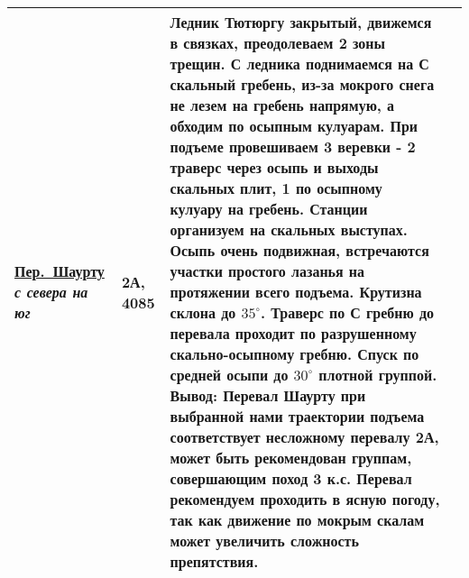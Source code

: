 \begin{longtable}{|>{\centering\arraybackslash}m{4.5cm}|>{\centering\arraybackslash}m{1.8cm}|>{\raggedright\arraybackslash}m{9.6cm}|>{\centering\arraybackslash}m{1.2cm}|}
			\hyperref[subsec:Day12]{{\small Пер.~Шаурту}}																	\newline\textit{с севера на юг}			&	2А,	4085					&	{\small Ледник Тютюргу закрытый, движемся в связках, преодолеваем 2 зоны трещин. С ледника поднимаемся на С скальный гребень, из-за мокрого снега не лезем на гребень напрямую, а обходим по осыпным кулуарам. При подъеме провешиваем 3 веревки - 2 траверс через осыпь и выходы скальных плит, 1 по осыпному кулуару на гребень. Станции организуем на скальных выступах. Осыпь очень подвижная, встречаются участки простого лазанья на протяжении всего подъема. Крутизна склона до $35^\circ$. Траверс по С гребню до перевала проходит по разрушенному скально-осыпному гребню. Спуск по средней осыпи до $30^\circ$ плотной группой. \newline \textbf{Вывод:} Перевал Шаурту при выбранной нами траектории подъема соответствует несложному перевалу 2А, может быть рекомендован группам, совершающим поход 3 к.с. Перевал рекомендуем проходить в ясную погоду, так как движение по мокрым скалам может увеличить сложность препятствия.}																																																																																																																																																																																					&			\\ \hline

\end{longtable}
